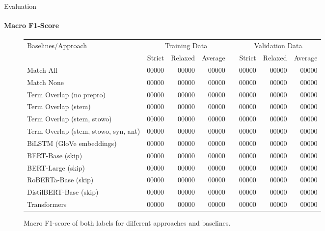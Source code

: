 \documentclass[english,handout]{mlutalk}
\begin{document}
\begin{frame}{Evaluation}
  \framesubtitle{Macro F1-Score}
  \begin{figure}
    \centering
    \caption{Macro F1-score of both labels for different approaches and baselines.}
    \tiny
    \begin{tabular}{lrrrlrrr}
      \toprule
      Baselines/Approach & \multicolumn{3}{c}{Training Data} & & \multicolumn{3}{c}{Validation Data}\\ \cmidrule{2-4} \cmidrule{6-8}
        & Strict & Relaxed & Average & & Strict & Relaxed & Average\\
      \midrule
      Match All                           & 00000 & 00000 & 00000 & & 00000 & 00000 & 00000\\
      Match None                          & 00000 & 00000 & 00000 & & 00000 & 00000 & 00000\\
      Term Overlap (no prepro)            & 00000 & 00000 & 00000 & & 00000 & 00000 & 00000\\
      Term Overlap (stem)                 & 00000 & 00000 & 00000 & & 00000 & 00000 & 00000\\
      Term Overlap (stem, stowo)          & 00000 & 00000 & 00000 & & 00000 & 00000 & 00000\\
      Term Overlap (stem, stowo, syn, ant)& 00000 & 00000 & 00000 & & 00000 & 00000 & 00000\\
      \midrule
      BiLSTM (GloVe embeddings)           & 00000 & 00000 & 00000 & & 00000 & 00000 & 00000\\
      BERT-Base (skip)                    & 00000 & 00000 & 00000 & & 00000 & 00000 & 00000\\
      BERT-Large (skip)                   & 00000 & 00000 & 00000 & & 00000 & 00000 & 00000\\
      RoBERTa-Base (skip)                 & 00000 & 00000 & 00000 & & 00000 & 00000 & 00000\\
      DistilBERT-Base (skip)              & 00000 & 00000 & 00000 & & 00000 & 00000 & 00000\\
      Transformers                        & 00000 & 00000 & 00000 & & 00000 & 00000 & 00000\\
      \bottomrule
    \end{tabular}
  \end{figure}
\end{frame}

\appendix
\section{\appendixname}

\bibliographyframe
\end{document}
